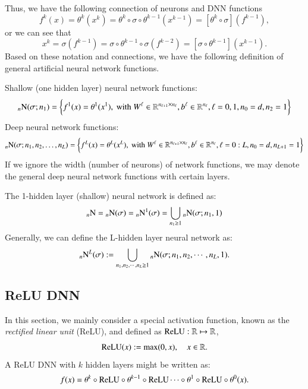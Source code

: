 Thus, we have the following connection of neurons and DNN functions
$$
f^k(x) = \theta^{k}(x^k) = \theta^{k} \circ \sigma \circ \theta^{k-1}(x^{k-1}) = [\theta^{k} \circ \sigma ] (f^{k-1}),
$$
or we can see that
$$
x^k = \sigma(f^{k-1}) = \sigma \circ \theta^{k-1} \circ \sigma (f^{k-2}) = [\sigma \circ \theta^{k-1}] (x^{k-1}).
$$
Based on these notation and connections, we have the following definition of
general artificial neural network functions.

Shallow (one hidden layer) neural network functions:
\begin{equation}
\label{NN1}
{}_n{\rm N}(\sigma; n_1) 
=\bigg\{ f^1(x) = \theta^1 (x^1), \mbox{ with } W^\ell\in \mathbb R^{n_{\ell+1}\times
	n_{\ell}}, b^\ell\in\mathbb R^{n_\ell}, \ell=0, 1, n_0=d, n_2 = 1\bigg\}  
\end{equation}
Deep neural network functions:
\begin{equation}
\label{NNL}
{}_n{\rm N}(\sigma; n_1,n_2,\ldots, n_L)=\bigg\{ f^{L}(x) = \theta^L (x^{L}), 
 \mbox{ with } W^\ell\in \mathbb R^{n_{\ell+1}\times
	n_{\ell}}, b^\ell\in\mathbb R^{n_\ell}, \ell=0:L, n_0=d, n_{L+1}=1\bigg\}  
\end{equation}
If we ignore the width (number of neurons) of network functions, we may 
denote the general deep neural network functions with certain layers.

The 1-hidden layer (shallow) neural network is defined as:
\begin{equation}
{}_n{\rm N}={}_n{\rm N}(\sigma) = {}_n{\rm N}^1(\sigma)
=\bigcup_{n_1\ge 1} {}_n{\rm N}(\sigma;n_1,1)
\end{equation}
Generally, we can define the L-hidden layer neural network as:
\begin{equation}
{}_n{\rm N}^L(\sigma) := \bigcup_{n_1, n_2, \cdots, n_{L}\ge 1} {}_n{\rm N}(\sigma;n_1,n_2,\cdots,n_L, 1).
\end{equation}







\subsection{ReLU DNN}
In this section, we mainly consider a special activation function,
known as the {\it rectified linear unit} (ReLU), and defined as $\rm
ReLU: \mathbb R\mapsto \mathbb R$,
\begin{equation}
\label{relu}
 {\rm ReLU}(x):=\max(0,x), \quad x\in\mathbb{R}. 
\end{equation}
A ReLU DNN with $k$ hidden layers might be written as:
\begin{equation}
\label{relu-dnn}
f(x) = \theta^{k}\circ {\rm ReLU} \circ \theta^{k-1} \circ {\rm ReLU} \cdots \circ \theta^1 \circ {\rm ReLU} \circ \theta^0(x).
\end{equation}

